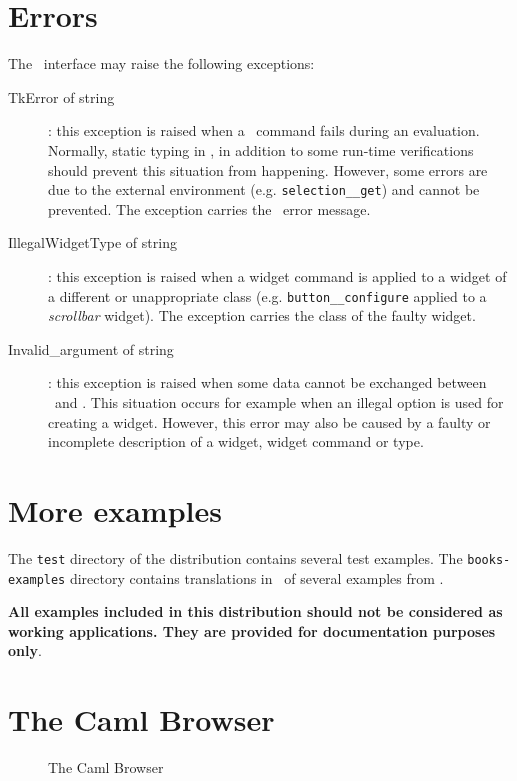 \section{Errors}
The \camltk\ interface may raise the following exceptions:
\begin{description}
\item[TkError of string]: this exception is raised when a \tcl\tk\ command
fails during an evaluation. Normally, static typing in \caml, in addition to
some run-time verifications should prevent this situation from happening.
However, some errors are due to the external environment (e.g.
\verb|selection__get|) and cannot be prevented. The exception carries the
\tcl\tk\ error message.

\item[IllegalWidgetType of string]:
this exception is raised when a widget command is applied to a widget of a
different or unappropriate class (e.g. \verb|button__configure| applied to
a {\em scrollbar} widget). The exception carries the class of the faulty
widget.

\item[Invalid\_argument of string]:
this exception is raised  when some data cannot be exchanged between \caml\
and \tk. This situation occurs for example when an illegal option is used
for creating a widget. However, this error may also be caused by a faulty or
incomplete description of a widget, widget command or type.
\end{description} 

\section{More examples}
The \verb|test| directory of the distribution contains several test
examples. 
The \verb|books-examples| directory contains translations in \camltk\ of
several examples from \cite{ouster94}.


{\bf All examples included in this distribution  should not be considered as
working applications. They are provided for documentation purposes only}.

\section{The Caml Browser}
\begin{latexonly}
\begin{figure}
\caption{The Caml Browser}
\begin{center}
\leavevmode
{}
\end{center}
\end{figure}
\end{latexonly}

